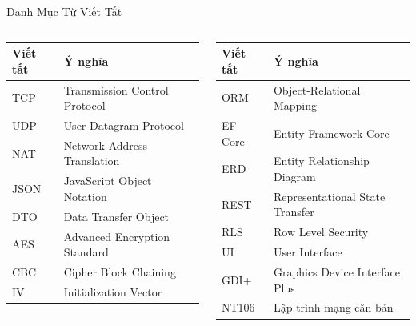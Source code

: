 \begin{frame}{Danh Mục Từ Viết Tắt}
  \footnotesize
  \begin{columns}[T]
    \begin{column}{0.48\textwidth}
      \begin{tabularx}{\textwidth}{@{}lY@{}}
        \toprule
        \textbf{Viết tắt} & \textbf{Ý nghĩa} \\
        \midrule
        TCP & Transmission Control Protocol \\
        UDP & User Datagram Protocol \\
        NAT & Network Address Translation \\
        JSON & JavaScript Object Notation \\
        DTO & Data Transfer Object \\
        AES & Advanced Encryption Standard \\
        CBC & Cipher Block Chaining \\
        IV & Initialization Vector \\
        \bottomrule
      \end{tabularx}
    \end{column}
    \begin{column}{0.48\textwidth}
      \begin{tabularx}{\textwidth}{@{}lY@{}}
        \toprule
        \textbf{Viết tắt} & \textbf{Ý nghĩa} \\
        \midrule
        ORM & Object-Relational Mapping \\
        EF Core & Entity Framework Core \\
        ERD & Entity Relationship Diagram \\
        REST & Representational State Transfer \\
        RLS & Row Level Security \\
        UI & User Interface \\
        GDI+ & Graphics Device Interface Plus \\
        NT106 & Lập trình mạng căn bản \\
        \bottomrule
      \end{tabularx}
    \end{column}
  \end{columns}
\end{frame}
